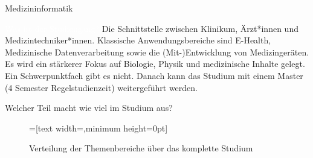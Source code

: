
\begin{Huge}
    Medizininformatik
\end{Huge}

\begin{exampleblock}{\textcolor{white}{Was ist der Studiengang?}}
    Die Schnittstelle zwischen Klinikum, Ärzt*innen und Medizintechniker*innen. Klassische Anwendungsbereiche sind E-Health, Medizinische Datenverarbeitung sowie die (Mit-)Entwicklung von Medizingeräten. Es wird ein stärkerer Fokus auf Biologie, Physik und medizinische Inhalte gelegt. Ein Schwerpunktfach gibt es nicht. Danach kann das Studium mit einem Master \\ (4 Semester Regelstudienzeit) weitergeführt werden.
\end{exampleblock}

\begin{block}{Welcher Teil macht wie viel im Studium aus?}
    \begin{figure}[h!]
        \vspace{-20pt}
        \begin{minipage}{\linewidth}
            \centering
            =[text width={},minimum height=0pt]
        \end{minipage}
        \vspace{-20pt}
        \caption{Verteilung der Themenbereiche über das komplette Studium}
    \end{figure}
\end{block}

